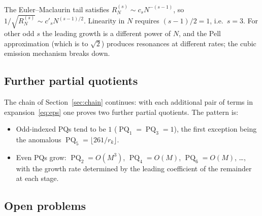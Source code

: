 \documentclass[12pt]{amsart}
\theoremstyle{definition}
\newcommand{\floor}[1]{\lfloor #1 \rfloor}
\DeclareMathOperator{\PQ}{PQ}
\begin{document}
The Euler--Maclaurin tail satisfies $R_N^{(s)} \sim c_s N^{-(s-1)}$,
so $1/\sqrt{R_N^{(s)}} \sim c'_s N^{(s-1)/2}$.  Linearity in $N$
requires $(s-1)/2 = 1$, i.e.\ $s = 3$.  For other odd $s$ the leading
growth is a different power of $N$, and the Pell approximation (which
is to $\sqrt{2}$) produces resonances at different rates; the cubic
emission mechanism breaks down.

\subsection{Further partial quotients}

The chain of Section~\ref{sec:chain} continues: with each additional
pair of terms in expansion~\eqref{eq:eps} one proves two further partial
quotients.  The pattern is:
\begin{itemize}
  \item Odd-indexed PQs tend to be $1$ ($\PQ_1 = \PQ_3 = 1$), the first
    exception being the anomalous $\PQ_5 = \floor{261/r_k}$.
  \item Even PQs grow: $\PQ_2 = O(M^3)$, $\PQ_4 = O(M)$, $\PQ_6 = O(M)$, \ldots,
    with the growth rate determined by the leading coefficient of the
    remainder at each stage.
\end{itemize}

\subsection{Open problems}
\end{document}
